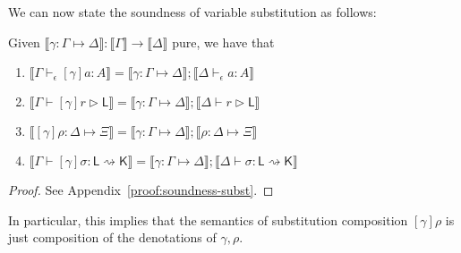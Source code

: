\documentclass[acmsmall,screen,review]{acmart}
\newcommand{\ms}[1]{\ensuremath{\mathsf{#1}}}
\newcommand{\rupg}[1]{{#1}^\upharpoonright}
\newcommand{\lupg}[1]{{#1}^\upharpoonleft}
\newcommand{\hasty}[4]{#1 \vdash_{#2} #3: {#4}}
\newcommand{\haslb}[3]{#1 \vdash #2 \rhd #3}
\newcommand{\issubst}[3]{#1: #2 \mapsto #3}
\newcommand{\lbsubst}[4]{#1 \vdash #2: #3 \rightsquigarrow #4}
\newcommand{\dnt}[1]{\llbracket{#1}\rrbracket}
\begin{document}
We can now state the soundness of variable substitution as follows:
\begin{theorem}[name=Soundness (Substitution), restate=soundnesssubst]
  Given $\dnt{\issubst{\gamma}{\Gamma}{\Delta}} : \dnt{\Gamma} \to \dnt{\Delta}$ pure, we have that
  \begin{enumerate}[label=(\alph*)]
    \item $\dnt{\hasty{\Gamma}{\epsilon}{[\gamma]a}{A}} 
      = \dnt{\issubst{\gamma}{\Gamma}{\Delta}};\dnt{\hasty{\Delta}{\epsilon}{a}{A}}$
      \label{itm:tm-subst-sound}
    \item $\dnt{\haslb{\Gamma}{[\gamma]r}{\ms{L}}}
      = \dnt{\issubst{\gamma}{\Gamma}{\Delta}};\dnt{\haslb{\Delta}{r}{\ms{L}}}$
    \item $\dnt{\issubst{[\gamma]\rho}{\Delta}{\Xi}}
      = \dnt{\issubst{\gamma}{\Gamma}{\Delta}};\dnt{\issubst{\rho}{\Delta}{\Xi}}$
    \item $\dnt{\lbsubst{\Gamma}{[\gamma]\sigma}{\ms{L}}{\ms{K}}}
      = \dnt{\issubst{\gamma}{\Gamma}{\Delta}};\dnt{\lbsubst{\Delta}{\sigma}{\ms{L}}{\ms{K}}}$
  \end{enumerate}
  \label{thm:subst-sound}
\end{theorem}
\begin{proof}
  See Appendix~\ref{proof:soundness-subst}.
\end{proof}
In particular, this implies that the semantics of substitution composition $[\gamma]\rho$ is just
composition of the denotations of $\gamma, \rho$.
\end{document}
